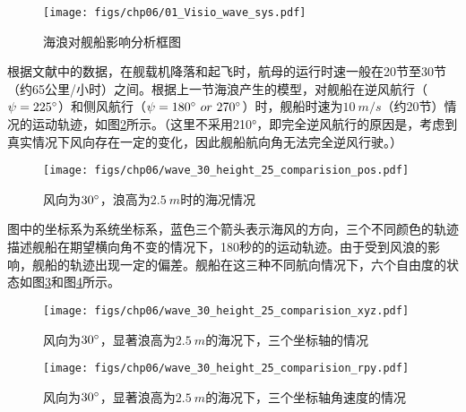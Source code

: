  \begin{figure}[!ht]
	\centering
	\texttt{[image: figs/chp06/01\_Visio\_wave\_sys.pdf]}	
	\caption{海浪对舰船影响分析框图}
	\label{fig:01_Visio_wave_sys}
\end{figure}
根据文献\cite{fitzgerald2004flight}中的数据，在舰载机降落和起飞时，航母的运行时速一般在20节至30节（约65公里/小时）之间。根据上一节海浪产生的模型，对舰船在逆风航行（$\psi=225\degree$）和侧风航行（$\psi = 180\degree\  or\  270\degree$）时，舰船时速为$10\ m/s$（约20节）情况的运动轨迹，如图\ref{fig:wave_30_height_25_comparision_pos}所示。（这里不采用210°，即完全逆风航行的原因是，考虑到真实情况下风向存在一定的变化，因此舰船航向角无法完全逆风行驶。）
 \begin{figure}[!ht]
	\centering
	\texttt{[image: figs/chp06/wave\_30\_height\_25\_comparision\_pos.pdf]}	
	\caption{风向为$30\degree$，浪高为$2.5\ m$时的海况情况}
	\label{fig:wave_30_height_25_comparision_pos}
\end{figure}
图中的坐标系为系统坐标系，蓝色三个箭头表示海风的方向，三个不同颜色的轨迹描述舰船在期望横向角不变的情况下，180秒的的运动轨迹。由于受到风浪的影响，舰船的轨迹出现一定的偏差。舰船在这三种不同航向情况下，六个自由度的状态如图\ref{fig:wave_30_height_25_comparision_xyz}和图\ref{fig:wave_30_height_25_comparision_rpy}所示。

 \begin{figure}[!ht]
	\centering
	\texttt{[image: figs/chp06/wave\_30\_height\_25\_comparision\_xyz.pdf]}	
	\caption{风向为$30\degree$，显著浪高为$2.5\ m$的海况下，三个坐标轴的情况}
	\label{fig:wave_30_height_25_comparision_xyz}
\end{figure}
 \begin{figure}[!ht]
	\centering
	\texttt{[image: figs/chp06/wave\_30\_height\_25\_comparision\_rpy.pdf]}	
	\caption{风向为$30\degree$，显著浪高为$2.5\ m$的海况下，三个坐标轴角速度的情况}
	\label{fig:wave_30_height_25_comparision_rpy}
\end{figure}

